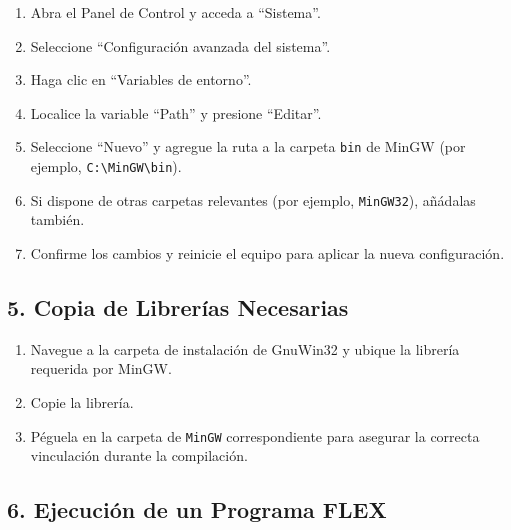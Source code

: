 \documentclass{article}
\begin{document}
\begin{enumerate}
    \item Abra el Panel de Control y acceda a ``Sistema''.
    \item Seleccione ``Configuración avanzada del sistema''.
    \item Haga clic en ``Variables de entorno''.
    \item Localice la variable ``Path'' y presione ``Editar''.
    \item Seleccione ``Nuevo'' y agregue la ruta a la carpeta \texttt{bin} de MinGW (por ejemplo, \texttt{C:\textbackslash MinGW\textbackslash bin}).
    \item Si dispone de otras carpetas relevantes (por ejemplo, \texttt{MinGW32}), añádalas también.
    \item Confirme los cambios y reinicie el equipo para aplicar la nueva configuración.
\end{enumerate}

\subsection*{5. Copia de Librerías Necesarias}

\begin{enumerate}
    \item Navegue a la carpeta de instalación de GnuWin32 y ubique la librería requerida por MinGW.
    \item Copie la librería.
    \item Péguela en la carpeta de \texttt{MinGW} correspondiente para asegurar la correcta vinculación durante la compilación.
\end{enumerate}

\subsection*{6. Ejecución de un Programa FLEX}
\end{document}
